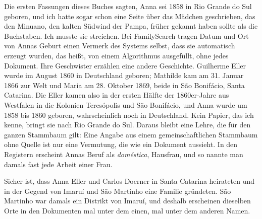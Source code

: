 \documentclass[
  ngerman,
  11pt,
  openany]{book}
\begin{document}
Die ersten Fassungen dieses Buches sagten, Anna sei 1858 in Rio Grande
do Sul geboren, und ich hatte sogar schon eine Seite über das Mädchen
geschrieben, das den Minuano, den kalten Südwind der Pampa, früher
gekannt haben sollte als die Buchstaben. Ich musste sie streichen. Bei
FamilySearch tragen Datum und Ort von Annas Geburt einen Vermerk des
Systems selbst, dass sie automatisch erzeugt wurden, das heißt, von
einem Algorithmus ausgefüllt, ohne jedes Dokument. Ihre Geschwister
erzählen eine andere Geschichte. Guilherme Eller wurde im August 1860 in
Deutschland geboren; Mathilde kam am 31. Januar 1866 zur Welt und Maria
am 28. Oktober 1869, beide in São Bonifácio, Santa Catarina. Die Eller
kamen also in der ersten Hälfte der 1860er-Jahre aus Westfalen in die
Kolonien Teresópolis und São Bonifácio, und Anna wurde um 1858 bis 1860
geboren, wahrscheinlich noch in Deutschland. Kein Papier, das ich kenne,
bringt sie nach Rio Grande do Sul. Daraus bleibt eine Lehre, die für den
ganzen Stammbaum gilt: Eine Angabe aus einem gemeinschaftlichen
Stammbaum ohne Quelle ist nur eine Vermutung, die wie ein Dokument
aussieht. In den Registern erscheint Annas Beruf als \emph{doméstica},
Hausfrau, und so nannte man damals fast jede Arbeit einer Frau.

Sicher ist, dass Anna Eller und Carlos Doerner in Santa Catarina
heirateten und in der Gegend von Imaruí und São Martinho eine Familie
gründeten. São Martinho war damals ein Distrikt von Imaruí, und deshalb
erscheinen dieselben Orte in den Dokumenten mal unter dem einen, mal
unter dem anderen Namen.
\end{document}
